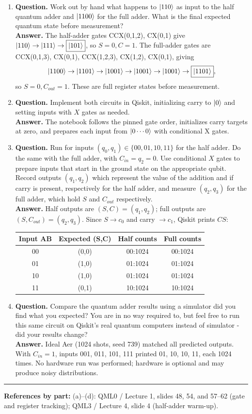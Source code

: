 \documentclass[
  11pt]{article}
\newcommand{\pagereferences}[1]{%
  \vfill
  \noindent\rule{\textwidth}{0.3pt}\par
  {\scriptsize\textbf{References by part:} #1\par}
}
\begin{document}
\small
\begin{enumerate}[label=\textbf{(\alph*)},leftmargin=*,itemsep=1pt,topsep=1pt,parsep=0pt]
\item \textbf{Question.} Work out by hand what happens to \(\ket{110}\) as input to the half quantum adder and \(\ket{1100}\) for the full adder. What is the final expected quantum state before measurement?\\
\textbf{Answer.} The half-adder gates CCX(0,1,2), CX(0,1) give \(\ket{110}\to\ket{111}\to\boxed{\ket{101}}\), so \(S=0,C=1\). The full-adder gates are CCX(0,1,3), CX(0,1), CCX(1,2,3), CX(1,2), CX(0,1), giving \[
\ket{1100}\to\ket{1101}\to\ket{1001}\to\ket{1001}\to\ket{1001}\to\boxed{\ket{1101}},
\] so \(S=0,C_{out}=1\). These are full register states before measurement.
\item \textbf{Question.} Implement both circuits in Qiskit, initializing carry to \(\ket{0}\) and setting inputs with \(X\) gates as needed.\\
\textbf{Answer.} The notebook follows the pinned gate order, initializes carry targets at zero, and prepares each input from \(\ket{0\cdots0}\) with conditional X gates.
\item \textbf{Question.} Run for inputs \((q_0,q_1)\in\{00,01,10,11\}\) for the half adder. Do the same with the full adder, with \(C_{in}=q_2=0\). Use conditional \(X\) gates to prepare inputs that start in the ground state on the appropriate qubit. Record outputs \((q_1,q_2)\) which represent the value of the addition and if carry is present, respectively for the half adder, and measure \((q_2,q_3)\) for the full adder, which hold \(S\) and \(C_{out}\) respectively.\\
\textbf{Answer.} Half outputs are \((S,C)=(q_1,q_2)\); full outputs are \((S,C_{out})=(q_2,q_3)\). Since \(S\to c_0\) and carry \(\to c_1\), Qiskit prints \(CS\):
\begin{center}\scriptsize
\begin{tabular}{c|c|c|c}
\textbf{Input AB} & \textbf{Expected (S,C)} & \textbf{Half counts} & \textbf{Full counts} \\
\hline
00 & (0,0) & 00:1024 & 00:1024 \\
01 & (1,0) & 01:1024 & 01:1024 \\
10 & (1,0) & 01:1024 & 01:1024 \\
11 & (0,1) & 10:1024 & 10:1024
\end{tabular}
\end{center}
\item \textbf{Question.} Compare the quantum adder results using a simulator did you find what you expected? You are in no way required to, but feel free to run this same circuit on Qiskit's real quantum computers instead of simulator - did your results change?\\
\textbf{Answer.} Ideal Aer (1024 shots, seed 739) matched all predicted outputs. With \(C_{in}=1\), inputs 001, 011, 101, 111 printed 01, 10, 10, 11, each 1024 times. No hardware run was performed; hardware is optional and may produce noisy distributions.
\end{enumerate}
\normalsize
\pagereferences{(a)--(d): QML0 / Lecture 1, slides 48, 54, and 57--62 (gate and register tracking); QML3 / Lecture 4, slide 4 (half-adder warm-up).}
\end{document}
